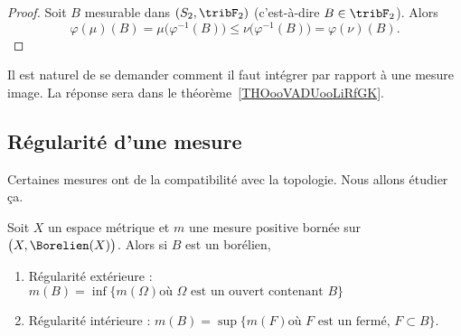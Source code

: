 \begin{proof}
    Soit \( B\) mesurable dans \( (S_2,\tribF_2)\) (c'est-à-dire \( B\in \tribF_2\)). Alors
    \begin{equation}
        \varphi(\mu)(B)=\mu\big( \varphi^{-1}(B) \big)\leq\nu\big( \varphi^{-1}(B) \big)=\varphi(\nu)(B).
    \end{equation}
\end{proof}

Il est naturel de se demander comment il faut intégrer par rapport à une mesure image. La réponse sera dans le théorème~\ref{THOooVADUooLiRfGK}.

\subsection{Régularité d'une mesure}

Certaines mesures ont de la compatibilité avec la topologie. Nous allons étudier ça.

\begin{theorem}     \label{ThoPKGEooVrpsGU}
    Soit \( X\) un espace métrique et \( m\) une mesure positive bornée sur \( \big(X,\Borelien(X)\big)\). Alors si \( B\) est un borélien,
    \begin{enumerate}
        \item
            Régularité extérieure : \( m(B)=\inf\{ m(\Omega)\text{où } \Omega\text{ est un ouvert contenant } B \}\)
        \item
            Régularité intérieure : \( m(B)=\sup\{ m(F) \text{où } F\text{ est un fermé, } F\subset B \}\).
    \end{enumerate}
\end{theorem}

